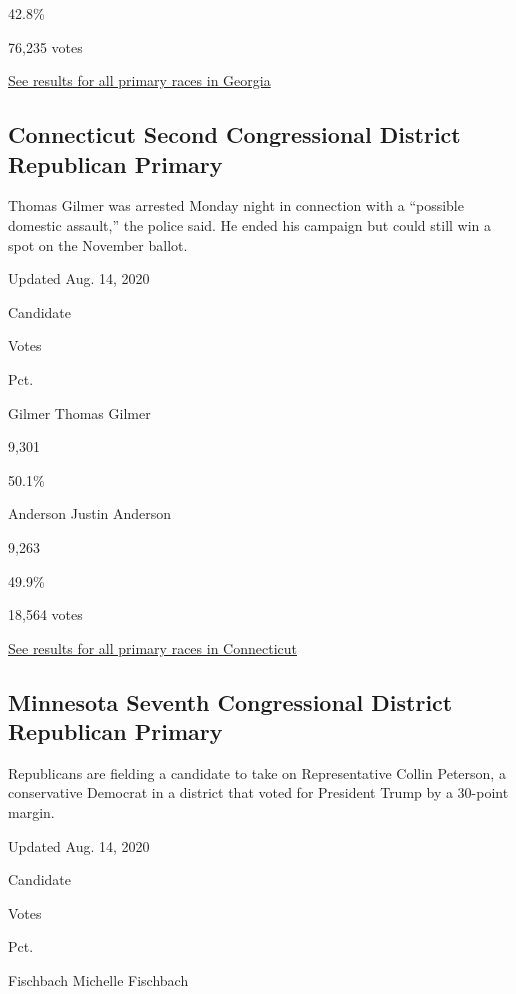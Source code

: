 42.8\%

76,235 votes

\href{https://www.nytimes3xbfgragh.onion/interactive/2020/08/11/us/elections/results-georgia-primary-runoff-elections.html}{See
results for all primary races in Georgia}

\hypertarget{connecticut-second-congressional-district-republican-primary}{%
\subsection{Connecticut Second Congressional District Republican
Primary}\label{connecticut-second-congressional-district-republican-primary}}

Thomas Gilmer was arrested Monday night in connection with a ``possible
domestic assault,'' the police said. He ended his campaign but could
still win a spot on the November ballot.

Updated Aug. 14, 2020

Candidate

Votes

Pct.

 Gilmer Thomas Gilmer

9,301

50.1\%

 Anderson Justin Anderson

9,263

49.9\%

18,564 votes

\href{https://www.nytimes3xbfgragh.onion/interactive/2020/08/11/us/elections/results-connecticut-primary-elections.html}{See
results for all primary races in Connecticut}

\hypertarget{minnesota-seventh-congressional-district-republican-primary}{%
\subsection{Minnesota Seventh Congressional District Republican
Primary}\label{minnesota-seventh-congressional-district-republican-primary}}

Republicans are fielding a candidate to take on Representative Collin
Peterson, a conservative Democrat in a district that voted for President
Trump by a 30-point margin.

Updated Aug. 14, 2020

Candidate

Votes

Pct.

 Fischbach Michelle Fischbach

